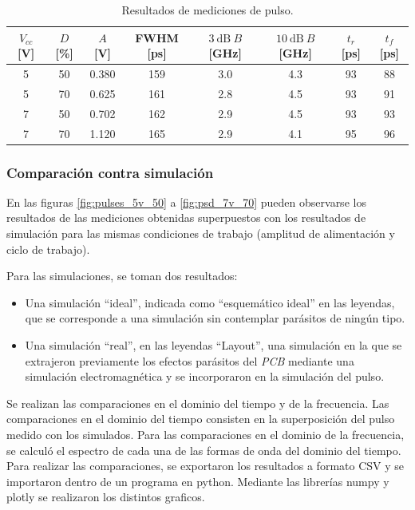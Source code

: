 \begin{table}[t!]
\centering
\begin{tabular}{cccccccc}
\hline
    $V_{cc}$ [\unit{\volt}] & $D$ [\unit{\percent}] & $A$ [\unit{\volt}] & FWHM
    [\unit{\pico\second}] & $\qty{3}{\dB} \ B$ [\unit{\giga\hertz}] &
    $\qty{10}{\dB} \ B$ [\unit{\giga\hertz}] & $t_r$ [\unit{\pico\second}] &
    $t_f$ [\unit{\pico\second}]\\
\hline
    5 & 50 & 0.380 & 159 & 3.0 & 4.3 & 93 & 88 \\
    5 & 70 & 0.625 & 161 & 2.8 & 4.5 & 93 & 91 \\
    7 & 50 & 0.702 & 162 & 2.9 & 4.5 & 93 & 93 \\
    7 & 70 & 1.120 & 165 & 2.9 & 4.1 & 95 & 96 \\
\hline
\end{tabular}
\caption{Resultados de mediciones de pulso.}
\label{tab:mediciones_pulso_resultados}
\end{table}

\subsubsection{Comparación contra simulación}
\label{sec:comp_simulacion}

En las figuras \ref{fig:pulses_5v_50} a \ref{fig:psd_7v_70} pueden observarse
los resultados de las mediciones obtenidas superpuestos con los resultados de
simulación para las mismas condiciones de trabajo (amplitud de alimentación y
ciclo de trabajo).

Para las simulaciones, se toman dos resultados:

\begin{itemize}
    \item Una simulación ``ideal'', indicada como ``esquemático ideal'' en las
      leyendas, que se corresponde a una simulación sin contemplar parásitos de
      ningún tipo.
    \item Una simulación ``real'', en las leyendas ``Layout'', una simulación en
      la que se extrajeron previamente los efectos parásitos del \textit{PCB}
      mediante una simulación electromagnética y se incorporaron en la
      simulación del pulso.
\end{itemize}

Se realizan las comparaciones en el dominio del tiempo y de la frecuencia. Las
comparaciones en el dominio del tiempo consisten en la superposición del pulso
medido con los simulados. Para las comparaciones en el dominio de la frecuencia,
se calculó el espectro de cada una de las formas de onda del dominio del tiempo.
Para realizar las comparaciones, se exportaron los resultados a formato CSV y se
importaron dentro de un programa en python. Mediante las librerías numpy y
plotly se realizaron los distintos graficos.

